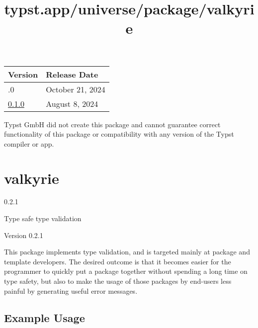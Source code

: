 \begin{longtable}[]{@{}ll@{}}
\toprule\noalign{}
Version & Release Date \\
\midrule\noalign{}
\endhead
\bottomrule\noalign{}
\endlastfoot
0.2.0 & October 21, 2024 \\
\href{https://typst.app/universe/package/gridlock/0.1.0/}{0.1.0} &
August 8, 2024 \\
\end{longtable}

Typst GmbH did not create this package and cannot guarantee correct
functionality of this package or compatibility with any version of the
Typst compiler or app.


\title{typst.app/universe/package/valkyrie}

\label{banner}
\section{valkyrie}\label{valkyrie}

{ 0.2.1 }

Type safe type validation

\label{readme}
Version 0.2.1

This package implements type validation, and is targeted mainly at
package and template developers. The desired outcome is that it becomes
easier for the programmer to quickly put a package together without
spending a long time on type safety, but also to make the usage of those
packages by end-users less painful by generating useful error messages.

\subsection{Example Usage}\label{example-usage}

\begin{Shaded}
\begin{Highlighting}[]

\NormalTok{      ),}
\NormalTok{    ),}
\NormalTok{  )}
\NormalTok{)}

\NormalTok{  (}
\NormalTok{    ),}
\NormalTok{  ),}
\NormalTok{)}
\end{Highlighting}
\end{Shaded}

